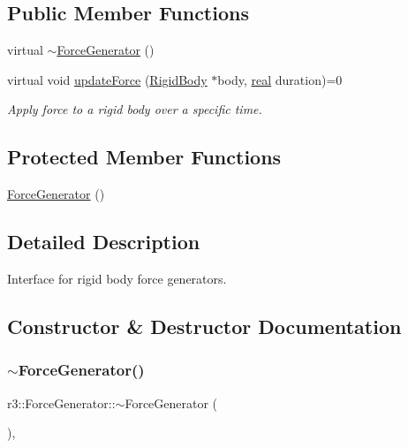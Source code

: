 \subsection*{Public Member Functions}
\begin{DoxyCompactItemize}
\item 
virtual \mbox{\hyperlink{classr3_1_1_force_generator_a64f1659bd0cf863ea28cccc689b2be3e}{$\sim$\+Force\+Generator}} ()
\item 
virtual void \mbox{\hyperlink{classr3_1_1_force_generator_a69bebbde8cef792d6636af50037af2aa}{update\+Force}} (\mbox{\hyperlink{classr3_1_1_rigid_body}{Rigid\+Body}} $\ast$body, \mbox{\hyperlink{namespacer3_ab2016b3e3f743fb735afce242f0dc1eb}{real}} duration)=0
\begin{DoxyCompactList}\small\item\em Apply force to a rigid body over a specific time. \end{DoxyCompactList}\end{DoxyCompactItemize}
\subsection*{Protected Member Functions}
\begin{DoxyCompactItemize}
\item 
\mbox{\hyperlink{classr3_1_1_force_generator_a7b21e48ccca59631975e0621057a1035}{Force\+Generator}} ()
\end{DoxyCompactItemize}


\subsection{Detailed Description}
Interface for rigid body force generators. 

\subsection{Constructor \& Destructor Documentation}
\mbox{\label{classr3_1_1_force_generator_a64f1659bd0cf863ea28cccc689b2be3e}} 
\subsubsection{\texorpdfstring{$\sim$\+Force\+Generator()}{~ForceGenerator()}}
{\footnotesize\ttfamily r3\+::\+Force\+Generator\+::$\sim$\+Force\+Generator (\begin{DoxyParamCaption}{ }\end{DoxyParamCaption})\hspace{0.3cm}{\ttfamily [virtual]}, {\ttfamily [default]}}

